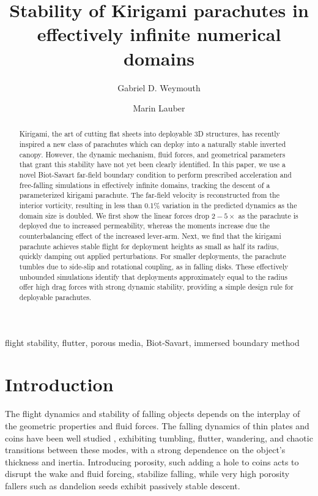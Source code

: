 \documentclass[lineno]{JFM-FLM_Au}
\title{Stability of Kirigami parachutes in effectively infinite numerical domains}
\author{Gabriel D. Weymouth\aff{1} \and Marin Lauber\aff{1}}
\affiliation{\aff{1}Faculty of Mechanical Engineering (ME), Delft University of Technology, Delft, Netherlands}
\begin{document}
\maketitle
\begin{abstract}
Kirigami, the art of cutting flat sheets into deployable 3D structures, has recently inspired a new class of parachutes which can deploy into a naturally stable inverted canopy. However, the dynamic mechanism, fluid forces, and geometrical parameters that grant this stability have not yet been clearly identified.
In this paper, we use a novel Biot-Savart far-field boundary condition to perform prescribed acceleration and free-falling simulations in effectively infinite domains, tracking the descent of a parameterized kirigami parachute. The far-field velocity is reconstructed from the interior vorticity, resulting in less than 0.1\% variation in the predicted dynamics as the domain size is doubled.
We first show the linear forces drop $2-5\times$ as the parachute is deployed due to increased permeability, whereas the moments increase due the counterbalancing effect of the increased lever-arm.
Next, we find that the kirigami parachute achieves stable flight for deployment heights as small as half its radius, quickly damping out applied perturbations. 
For smaller deployments, the parachute tumbles due to side-slip and rotational coupling, as in falling disks.
These effectively unbounded simulations identify that deployments approximately equal to the radius offer high drag forces with strong dynamic stability, providing a simple design rule for deployable parachutes. 

\end{abstract}

\begin{keywords}
flight stability, flutter, porous media, Biot-Savart, immersed boundary method
\end{keywords}

\section{Introduction}\label{sec:intro}

The flight dynamics and stability of falling objects depends on the interplay of the geometric properties and fluid forces. The falling dynamics of thin plates and coins have been well studied \citep{Andersen2005UnsteadyPlates, Auguste2013FallingDisks}, exhibiting tumbling, flutter, wandering, and chaotic transitions between these modes, with a strong dependence on the object's thickness and inertia. Introducing porosity, such adding a hole to coins \citep{Vincent2016HolesCoins} acts to disrupt the wake and fluid forcing, stabilize falling, while very high porosity fallers such as dandelion seeds \citep{Cummins2018ADandelion,Bose2025PorousIncidence} exhibit passively stable descent.
\end{document}
